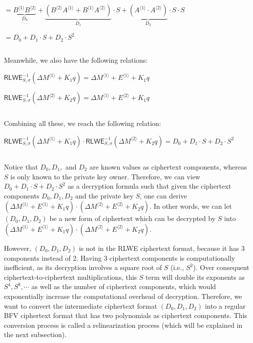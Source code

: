 $ = \underbrace{B^{\langle 1 \rangle}B^{\langle 2 \rangle}}_{D_0}  + \underbrace{(B^{\langle 2 \rangle}A^{\langle 1 \rangle} + B^{\langle 1 \rangle}A^{\langle 2 \rangle})}_{D_1} \cdot S + \underbrace{(A^{\langle 1 \rangle} \cdot A^{\langle 2 \rangle})}_{D_2} \cdot S \cdot S $



$= D_0 + D_1\cdot S + D_2\cdot S^2$



$ $

Meanwhile, we also have the following relations:

$\textsf{RLWE}_{S, \sigma}^{-1}(\Delta M^{\langle 1 \rangle} + K_1q) = \Delta M^{\langle 1 \rangle} + E^{\langle 1 \rangle} + K_1q$

$\textsf{RLWE}_{S, \sigma}^{-1}(\Delta M^{\langle 2 \rangle} + K_2q) = \Delta M^{\langle 1 \rangle} + E^{\langle 2 \rangle} + K_1q$

$ $

Combining all these, we reach the following relation: 

$\textsf{RLWE}_{S, \sigma}^{-1}(\Delta M^{\langle 1 \rangle} + K_1q) \cdot \textsf{RLWE}_{S, \sigma}^{-1}(\Delta M^{\langle 2 \rangle} + K_2q) = D_0 + D_1\cdot S + D_2\cdot S^2$

$ $

Notice that $D_0, D_1,$ and $D_2$ are known values as ciphertext components, whereas $S$ is only known to the private key owner. Therefore, we can view $D_0 + D_1\cdot S + D_2\cdot S^2$ as a decryption formula such that given the ciphertext components $D_0, D_1, D_2$ and the private key $S$, one can derive $(\Delta M^{\langle 1 \rangle} + E^{\langle 1 \rangle} + K_1q) \cdot (\Delta M^{\langle 2 \rangle} + E^{\langle 2 \rangle} + K_2q)$. In other words, we can let $(D_0, D_1, D_2)$ be a new form of ciphertext which can be decrypted by $S$ into $(\Delta M^{\langle 1 \rangle} + E^{\langle 1 \rangle} + K_1q) \cdot (\Delta M^{\langle 2 \rangle} + E^{\langle 2 \rangle} + K_2q)$. 

However, $(D_0, D_1, D_2)$ is not in the RLWE ciphertext format, because it has 3 components instead of 2. Having 3 ciphertext components is computationally inefficient, as its decryption involves a square root of $S$ (i.e., $ S^2$). Over consequent ciphertext-to-ciphertext multiplications, this $S$ term will double its exponents as $S^4, S^8, \cdots$ as well as the number of ciphertext components, which would exponentially increase the computational overhead of decryption. Therefore, we want to convert the intermediate ciphertext format $(D_0, D_1, D_2)$ into a regular BFV ciphertext format that has two polynomials as ciphertext components. This conversion process is called a relinearization process (which will be explained in the next subsection). 



